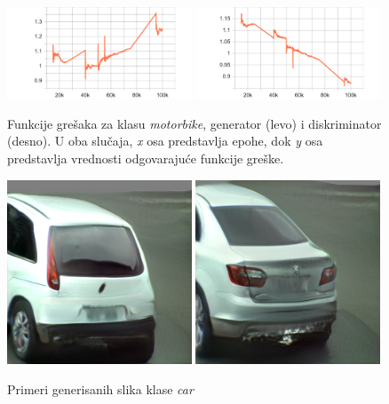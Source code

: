 \documentclass[12pt,oneside]{memoir}
\begin{document}
\begin{figure}[!htbp]
\centering
  \includegraphics[width=0.49\textwidth]{matfmaster/stylegan/motorbike/g_loss.png}
  \includegraphics[width=0.49\textwidth]{matfmaster/stylegan/motorbike/d_loss.png}
\caption{Funkcije grešaka za klasu \textit{motorbike}, generator (levo) i diskriminator (desno). U oba slučaja, \textit{x} osa predstavlja epohe, dok \textit{y} osa predstavlja vrednosti odgovarajuće funkcije greške. }\label{fig:section4_stylegan_motorbike_loss}
\end{figure}

\begin{figure}[!htbp]
\centering
    \includegraphics[width=0.49\textwidth]{matfmaster/stylegan/car/image1.png}  \includegraphics[width=0.49\textwidth]{matfmaster/stylegan/car/image2.png}
\caption{Primeri generisanih slika klase \textit{car}}
\label{fig:section4_stylegan_car_images}
\end{figure}
\end{document}
